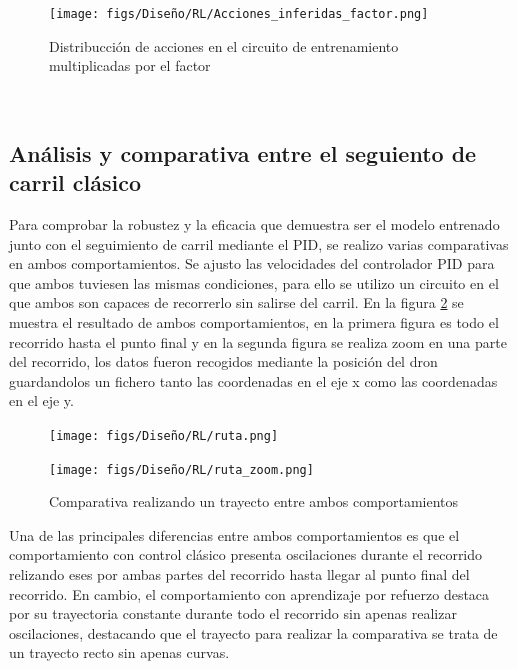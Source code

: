 \begin{figure} [H]
  \begin{center}
    \texttt{[image: figs/Diseño/RL/Acciones\_inferidas\_factor.png]}
  \end{center}
  \caption{Distribucción de acciones en el circuito de entrenamiento multiplicadas por el factor}
  \label{fig:inferencia_factor}
\end{figure}\


\subsection{Análisis y comparativa entre el seguiento de carril clásico}
\label{sec:Análisis y comparativa entre el seguiento de carril clásico}
Para comprobar la robustez y la eficacia que demuestra ser el modelo entrenado junto con el seguimiento de carril mediante el PID, se realizo varias comparativas en ambos
comportamientos. Se ajusto las velocidades del controlador PID para que ambos tuviesen las mismas condiciones, para ello se utilizo un circuito en el que ambos son capaces 
de recorrerlo sin salirse del carril. En la figura \ref{fig:comparativa} se muestra el resultado de ambos comportamientos, en la primera figura es todo el recorrido hasta el punto
final y en la segunda figura se realiza zoom en una parte del recorrido, los datos fueron recogidos mediante la posición del dron guardandolos un fichero tanto las coordenadas 
en el eje x como las coordenadas en el eje y. 
  
\begin{figure}[H]
  \centering
  \begin{minipage}{1.0\textwidth}
    \texttt{[image: figs/Diseño/RL/ruta.png]}
  \end{minipage}
  \hfill
  \begin{minipage}{1.0\textwidth}
    \texttt{[image: figs/Diseño/RL/ruta\_zoom.png]}
  \end{minipage}
  \caption{Comparativa realizando un trayecto entre ambos comportamientos}
  \label{fig:comparativa}
\end{figure}

Una de las principales diferencias entre ambos comportamientos es que el comportamiento con control clásico presenta oscilaciones durante el recorrido relizando eses 
por ambas partes del recorrido hasta llegar al punto final del recorrido. En cambio, el comportamiento con aprendizaje por refuerzo destaca por su trayectoria constante 
durante todo el recorrido sin apenas realizar oscilaciones, destacando que el trayecto para realizar la comparativa se trata de un trayecto recto sin apenas curvas. 

